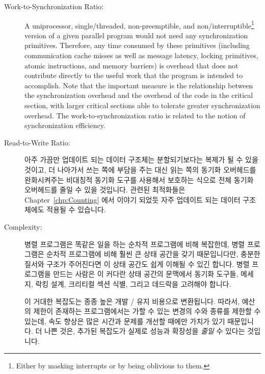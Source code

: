 \begin{description}
\item[Work-to-Synchronization Ratio:]  A uniprocessor,
	single\-/threaded, non-preemptible, and non\-/interruptible\footnote{
		Either by masking interrupts or by being oblivious to them.}
	version of a given parallel
	program would not need any synchronization primitives.
	Therefore, any time consumed by these primitives
	(including communication cache misses as well as
	message latency, locking primitives, atomic instructions,
	and memory barriers)
	is overhead that does not contribute directly to the useful
	work that the program is intended to accomplish.
	Note that the important measure is the
	relationship between the synchronization overhead
	and the overhead of the code in the critical section, with larger
	critical sections able to tolerate greater synchronization overhead.
	The work-to-synchronization ratio is related to
	the notion of synchronization efficiency.
\fi
\item[Read-to-Write Ratio:]  아주 가끔만 업데이트 되는 데이터 구조체는
	분할되기보다는 복제가 될 수 있을 것이고, 더 나아가서 쓰는 쪽에 부담을
	주는 대신 읽는 쪽의 동기화 오버헤드를 완화시켜주는 비대칭적 동기화
	도구를 사용해서 보호하는 식으로 전체 동기화 오버헤드를 줄일 수 있을
	것입니다.
	관련된 최적화들은 Chapter~\ref{chp:Counting} 에서 이야기 되었듯 자주
	업데이트 되는 데이터 구조체에도 적용될 수 있습니다.
\iffalse

\item[Read-to-Write Ratio:]  A data structure that is
	rarely updated may often be replicated rather than partitioned,
	and furthermore may be protected with asymmetric
	synchronization primitives that reduce readers' synchronization
	overhead at the expense of that of writers, thereby
	reducing overall synchronization overhead.
	Corresponding optimizations are possible for frequently
	updated data structures, as discussed in
	Chapter~\ref{chp:Counting}.
\fi
\item[Complexity:]  병렬 프로그램은 똑같은 일을 하는 순차적 프로그램에 비해
	복잡한데, 병렬 프로그램은 순차적 프로그램에 비해 훨씬 큰 상태 공간을
	갖기 때문입니다만, 충분한 질서와 구조가 주어진다면 이 상태 공간도 쉽게
	이해될 수 있긴 합니다.
	병렬 프로그램을 만드는 사람은 이 커다란 상태 공간의 문맥에서 동기화
	도구들, 메세지, 락킹 설계, 크리티컬 섹션 식별, 그리고 데드락을 고려해야
	합니다.

	이 거대한 복잡도는 종종 높은 개발 / 유지 비용으로 변환됩니다.
	따라서, 예산의 제한이 존재하는 프로그램에서는 가할 수 있는 변경의 수와
	종류를 제한할 수 있는데, 속도 향상은 많은 시간과 문제를 개선할 때에만
	가치가 있기 때문입니다.
	더 나쁜 것은, 추가된 복잡도가 실제로 성능과 확장성을 \emph{줄일} 수
	있다는 것입니다.


\end{description}
